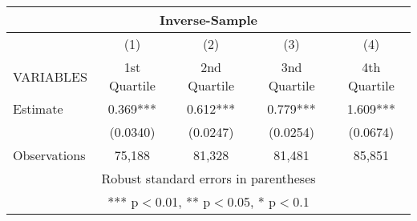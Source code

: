 \begin{tabular}{lcccc}
\multicolumn{5}{c}{Inverse-Sample} \\ \hline
 & (1) & (2) & (3) & (4) \\
VARIABLES & 1st Quartile & 2nd Quartile & 3nd Quartile & 4th Quartile \\ \hline
Estimate & 0.369*** & 0.612*** & 0.779*** & 1.609*** \\
 & (0.0340) & (0.0247) & (0.0254) & (0.0674) \\
 Observations & 75,188 & 81,328 & 81,481 & 85,851 \\ \hline
\multicolumn{5}{c}{ Robust standard errors in parentheses} \\
\multicolumn{5}{c}{ *** p$<$0.01, ** p$<$0.05, * p$<$0.1} \\
\end{tabular}
